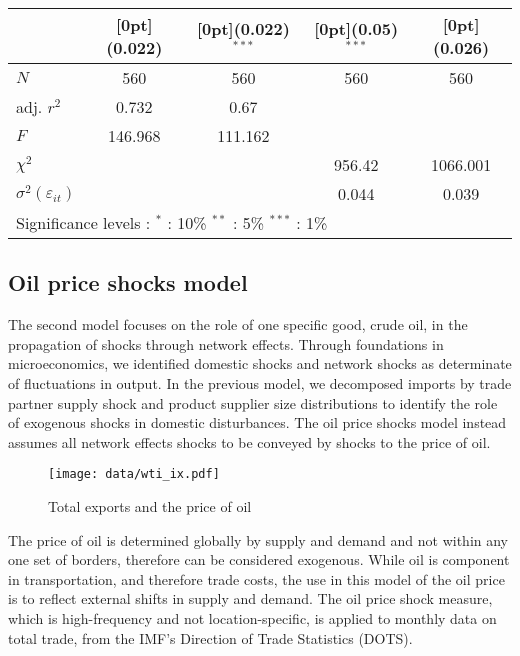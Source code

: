 \documentclass[10pt,letterpaper]{article}
\begin{document}
\begin{table}[htbp]
\begin{tabular*}{0.8\textwidth}{@{\extracolsep{\fill}}lcccc}
&	\raisebox{.7ex}[0pt]{\scriptsize (0.022)} &	\raisebox{.7ex}[0pt]{\scriptsize (0.022)$^{***}$} &	\raisebox{.7ex}[0pt]{\scriptsize (0.05)$^{***}$} &	\raisebox{.7ex}[0pt]{\scriptsize (0.026)} \\
\hline
$N$ &	560 &	560 &	560 &	560 \\
adj. $r^2$ &	0.732 &	0.67 &	&	\\
$F$ &	146.968 &	111.162 &	&	\\
$\chi^2$ &	&	&	956.42 &	1066.001 \\
$\sigma^2(\varepsilon_{it})$ &	&	&	0.044 &	0.039 \\
\hline\hline		
\multicolumn{5}{l}{\footnotesize{Significance levels
:\hspace{1em} $^{*}$ : 10\% \hspace{1em}
$^{**}$ : 5\% \hspace{1em} $^{***}$ : 1\% \normalsize}}
\end{tabular*}
\end{table}

\subsection{Oil price shocks model}
The second model focuses on the role of one specific good, crude oil, in the propagation of shocks through network effects. Through foundations in microeconomics, we identified domestic shocks and network shocks as determinate of fluctuations in output. In the previous model, we decomposed imports by trade partner supply shock and product supplier size distributions to identify the role of exogenous shocks in domestic disturbances. The oil price shocks model instead assumes all network effects shocks to be conveyed by shocks to the price of oil. 


\begin{figure}
  \caption{Total exports and the price of oil}
  \centering
\texttt{[image: data/wti\_ix.pdf]} 
\end{figure}


The price of oil is determined globally by supply and demand and not within any one set of borders, therefore can be considered exogenous. While oil is component in transportation, and therefore trade costs, the use in this model of the oil price is to reflect external shifts in supply and demand. The oil price shock measure, which is high-frequency and not location-specific, is applied to monthly data on total trade, from the IMF's Direction of Trade Statistics (DOTS).
\end{document}
